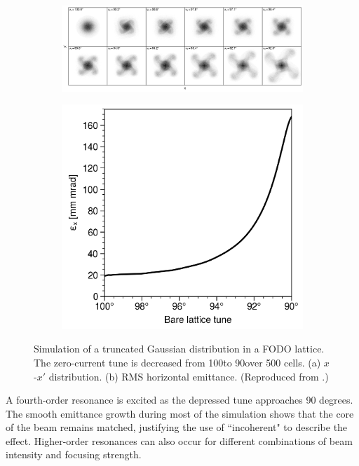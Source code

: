\begin{figure}[!p]
    \centering
    \begin{subfigure}{\textwidth}
        \includegraphics[width=\textwidth]{Images/chapter1/incoherent_resonance_fourth_order.png}
        \label{fig:incoherent_instability_a}
        \caption{}
    \end{subfigure}
    \begin{subfigure}{0.5\textwidth}
        \includegraphics[width=\textwidth]{Images/chapter1/incoherent_resonance_fourth_order_emittance.png}
        \label{fig:incoherent_instability_b}
        \caption{}
    \end{subfigure}
    \caption{Simulation of a truncated Gaussian distribution in a FODO lattice. The zero-current tune is decreased from 100\degree to 90\degree over 500 cells. (a) $x$-$x'$ distribution. (b) RMS horizontal emittance. (Reproduced from \cite{Hofmann2017Book}.)}
    \label{fig:incoherent_instability}
\end{figure}
%
A fourth-order resonance is excited as the depressed tune approaches 90 degrees. The smooth emittance growth during most of the simulation shows that the core of the beam remains matched, justifying the use of ``incoherent" to describe the effect. Higher-order resonances can also occur for different combinations of beam intensity and focusing strength.



